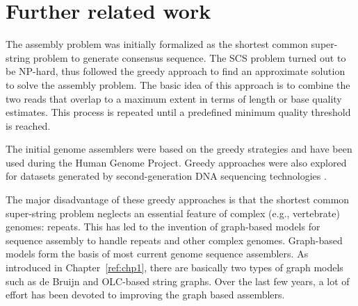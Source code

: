 
\section{Further related work}
The assembly problem was initially formalized as the shortest common super-string problem \citep{maier1978complexity} to generate consensus sequence.
The SCS problem turned out to be NP-hard, thus \cite{tarhio1988greedy} followed the greedy approach to find an approximate solution to solve the assembly problem.
The basic idea of this approach is to combine the two reads that overlap to a maximum extent in terms of length or base quality estimates.
This process is repeated until a predefined minimum quality threshold is reached.

The initial genome assemblers \citep{sutton1995tigr, Green99phrapdocumentation} were based on the greedy strategies and have been used during the Human Genome Project.
Greedy approaches were also explored for datasets generated by second-generation DNA sequencing technologies \citep{warren2006assembling, jeck2007extending}.

The major disadvantage of these greedy approaches is that the shortest common super-string problem neglects an essential feature of complex (e.g.,
vertebrate) genomes: repeats. This has led to the invention of graph-based models for sequence assembly to handle repeats and other complex genomes.
Graph-based models form the basis of most current genome sequence assemblers. 
As introduced in Chapter~\ref{ref:chp1}, there are basically two types of graph models such as de Bruijn and OLC-based string graphs.
Over the last few years, a lot of effort has been devoted to improving the graph based assemblers. 

